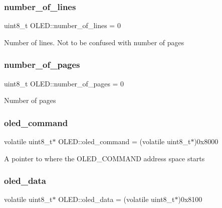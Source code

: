\subsubsection{\texorpdfstring{number\+\_\+of\+\_\+lines}{number\_of\_lines}}
{\footnotesize\ttfamily uint8\+\_\+t O\+L\+E\+D\+::number\+\_\+of\+\_\+lines = 0\hspace{0.3cm}{\ttfamily [private]}}

Number of lines. Not to be confused with number of pages \hypertarget{class_o_l_e_d_aaac99b0eb4e9dfe92b8571488dc89288}{}\label{class_o_l_e_d_aaac99b0eb4e9dfe92b8571488dc89288} 
\subsubsection{\texorpdfstring{number\+\_\+of\+\_\+pages}{number\_of\_pages}}
{\footnotesize\ttfamily uint8\+\_\+t O\+L\+E\+D\+::number\+\_\+of\+\_\+pages = 0\hspace{0.3cm}{\ttfamily [private]}}

Number of pages \hypertarget{class_o_l_e_d_af0a85ccd0274347b8c1ac77d298a14cf}{}\label{class_o_l_e_d_af0a85ccd0274347b8c1ac77d298a14cf} 
\subsubsection{\texorpdfstring{oled\+\_\+command}{oled\_command}}
{\footnotesize\ttfamily volatile uint8\+\_\+t$\ast$ O\+L\+E\+D\+::oled\+\_\+command = (volatile uint8\+\_\+t$\ast$)0x8000\hspace{0.3cm}{\ttfamily [private]}}

A pointer to where the O\+L\+E\+D\+\_\+\+C\+O\+M\+M\+A\+ND address space starts \hypertarget{class_o_l_e_d_a1bc54d49808f92ddfc354511b692df6f}{}\label{class_o_l_e_d_a1bc54d49808f92ddfc354511b692df6f} 
\subsubsection{\texorpdfstring{oled\+\_\+data}{oled\_data}}
{\footnotesize\ttfamily volatile uint8\+\_\+t$\ast$ O\+L\+E\+D\+::oled\+\_\+data = (volatile uint8\+\_\+t$\ast$)0x8100\hspace{0.3cm}{\ttfamily [private]}}


